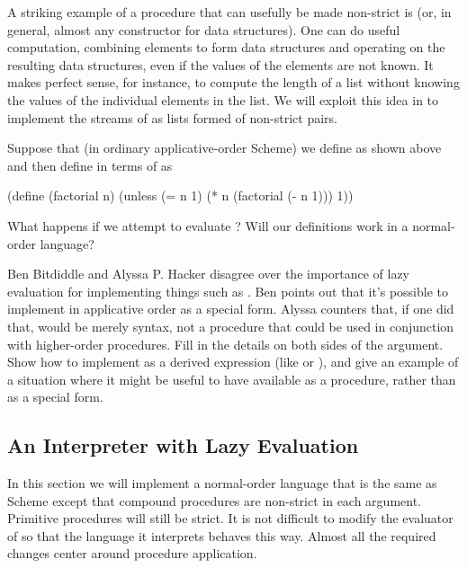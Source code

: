 A striking example of a procedure that can usefully be made non-strict is
 (or, in general, almost any constructor for data structures).  One
can do useful computation, combining elements to form data structures and
operating on the resulting data structures, even if the values of the elements
are not known.  It makes perfect sense, for instance, to compute the length of
a list without knowing the values of the individual elements in the list.  We
will exploit this idea in  to implement the streams of
 as lists formed of non-strict  pairs.

\begin{exerciseGroup}
\label{Exercise 4.25}
 Suppose that (in ordinary
applicative-order Scheme) we define  as shown above and then
define  in terms of  as

\begin{codeBlock}
(define (factorial n)
  (unless (= n 1)
          (* n (factorial (- n 1)))
          1))
\end{codeBlock}

What happens if we attempt to evaluate ?  Will our
definitions work in a normal-order language?

\label{Exercise 4.26}
 Ben Bitdiddle and Alyssa
P. Hacker disagree over the importance of lazy evaluation for implementing
things such as .  Ben points out that it's possible to implement
 in applicative order as a special form.  Alyssa counters that, if
one did that,  would be merely syntax, not a procedure that could
be used in conjunction with higher-order procedures.  Fill in the details on
both sides of the argument.  Show how to implement  as a derived
expression (like  or ), and give an example of a situation
where it might be useful to have  available as a procedure, rather
than as a special form.
\end{exerciseGroup}

\subsection{An Interpreter with Lazy Evaluation}
\label{Section 4.2.2}

In this section we will implement a normal-order language that is the same as
Scheme except that compound procedures are non-strict in each argument.
Primitive procedures will still be strict.  It is not difficult to modify the
evaluator of  so that the language it interprets behaves
this way.  Almost all the required changes center around procedure application.

